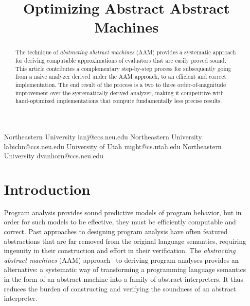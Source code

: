 \documentclass[preprint,onecolumn,9pt]{sigplanconf} %
\newcommand{\naive}{naive}
\begin{document}
\copyrightdata{[to be supplied]}


\title{Optimizing Abstract Abstract Machines}

           {Northeastern University}
           {ianj@ccs.neu.edu}
           {Northeastern University}
           {labichn@ccs.neu.edu}
           {University of Utah}
           {might@cs.utah.edu}
           {Northeastern University}
           {dvanhorn@ccs.neu.edu}
\maketitle

\begin{abstract}
The technique of \emph{abstracting abstract machines} (AAM) provides a systematic approach for deriving computable approximations of evaluators that are easily proved sound.
%
This article contributes a complementary step-by-step process for subsequently going from a \naive{} analyzer derived under the AAM approach, to an efficient and correct implementation.
%
The end result of the process is a two to three order-of-magnitude improvement over the systematically derived analyzer, making it competitive with hand-optimized implementations that compute fundamentally less precise results.
\end{abstract}




\section{Introduction}

Program analysis provides sound predictive models of program behavior, but in order for such models to be effective, they must be efficiently computable and correct.
%
Past approaches to designing program analysis have often featured abstractions that are far removed from the original language semantics, requiring ingenuity in their construction and effort in their verification.
%
The \emph{abstracting abstract machines} (AAM) approach~\cite{dvanhorn:VanHorn2011Abstracting,dvanhorn:VanHorn2012Systematic} to deriving program analyses provides an alternative: a systematic way of transforming a programming language semantics in the form of an abstract machine into a family of abstract interpreters.
%
It thus reduces the burden of constructing and verifying the soundness of an abstract interpreter.
%
\end{document}
